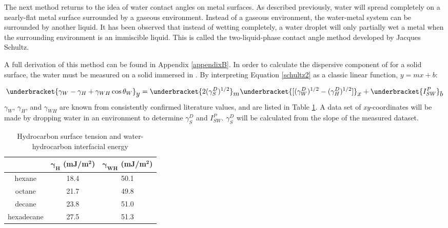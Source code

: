 The next method returns to the idea of water contact angles on metal surfaces. As described previously, water will spread completely on a nearly-flat metal surface surrounded by a gaseous environment. Instead of a gaseous environment, the water-metal system can be surrounded by another liquid. It has been observed that instead of wetting completely, a water droplet will only partially wet a metal when the surrounding environment is an immiscible liquid. This is called the two-liquid-phase contact angle method developed by Jacques Schultz.\cite{Schultz1977,Schultz1977a,Schultz1992} 

A full derivation of this method can be found in Appendix \ref{appendixB}. In order to calculate the dispersive component of \gamSV for a solid surface, the water \ca must be measured on a solid immersed in \nalk[s]. By interpreting Equation \ref{schultz2} as a classic linear function, $y = mx + b$:

\[
\underbracket{\gamma_{W}-\gamma_{H}+\gamma_{WH}\cos\theta_{W}}_{\text{\normalsize{$y$}}} =
\underbracket{2(\gamma_{S}^{D})^{1/2}}_{\text{\normalsize{$m$}}}  
\underbracket{[(\gamma_{W}^{D})^{1/2}-(\gamma_{H}^{D})^{1/2}] }_{\text{\normalsize{$x$}}} + 
\underbracket{I_{SW}^{P}}_{\text{\normalsize{$b$}}} 
\] 
$\gamma_{W}$, $\gamma_{H}$, and $\gamma_{WH}$ are known from consistently confirmed literature values,\cite{Chassin1986,Smitthipong2004,Takanashi2013,Nakamura2015} and are listed in Table \ref{knownsurften}. A data set of \textit{xy}-coordinates will be made by dropping water in an \nalk environment to determine $\gamma_{S}^{D}$ and $I_{SW}^{P} $. $\gamma_{S}^{D} $ will be calculated from the slope of the measured dataset. 

\begin{table}[h!]
	\centering
	\caption{Hydrocarbon surface tension and water-hydrocarbon interfacial energy}
	\begin{tabular} { |c||c|c|  } %
		\hline
		\textbf{\nalk[s]}	&\textbf{$\bm{\gamma_{H}}$ (mJ/m$\bm{^{2}}$)}	&\textbf{$\bm{\gamma_{WH}}$ (mJ/m$\bm{^{2}}$)}	\\
		\hline
		hexane		&18.4	&50.1 \\
		\hline
		octane		&21.7	&49.8 \\
		\hline
		decane		&23.8	&51.0 \\
		\hline
		hexadecane	&27.5	&51.3 \\
		\hline
	\end{tabular}
	\label{knownsurften}
\end{table}

